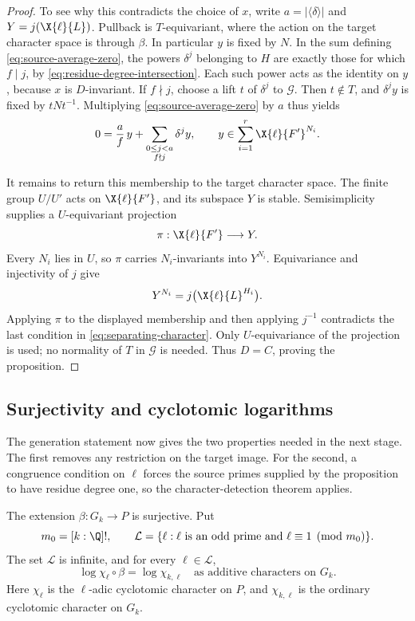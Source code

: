 \begin{proof}
To see why this contradicts the choice of $x$, write
$a=|\langle\delta\rangle|$ and $Y=j(\X{\ell}{L})$.
Pullback is $T$-equivariant, where the action on the target
character space is through $\beta$. In particular $y$ is fixed
by $N$. In the sum defining \eqref{eq:source-average-zero}, the
powers $\delta^j$ belonging to $H$ are exactly those for which
$f\mid j$, by \eqref{eq:residue-degree-intersection}. Each such
power acts as the identity on $y$, because $x$ is $D$-invariant.
If $f\nmid j$, choose a lift $t$ of $\delta^j$ to $\mathcal G$.
Then $t\notin T$, and $\delta^jy$ is fixed by $tNt^{-1}$.
Multiplying \eqref{eq:source-average-zero} by $a$ thus yields
\[
  0=\frac af\,y+\sum_{\substack{0\leq j<a\\f\nmid j}}\delta^jy,
  \qquad
  y\in\sum_{i=1}^r\X{\ell}{F'}^{N_i}.
\]

It remains to return this membership to the target character
space. The finite group $U/U'$ acts on $\X{\ell}{F'}$, and its
subspace $Y$ is stable. Semisimplicity supplies a $U$-equivariant
projection
\[
  \pi:\X{\ell}{F'}\longrightarrow Y.
\]
Every $N_i$ lies in $U$, so $\pi$ carries $N_i$-invariants into
$Y^{N_i}$. Equivariance and injectivity of $j$ give
\[
 Y^{N_i}=j\bigl(\X{\ell}{L}^{H_i}\bigr).
\]
Applying $\pi$ to the displayed membership and then applying
$j^{-1}$ contradicts the last condition in
\eqref{eq:separating-character}. Only $U$-equivariance of the
projection is used; no normality of $T$ in $\mathcal G$ is needed.
Thus $D=C$, proving the proposition.
\end{proof}

\subsection{Surjectivity and cyclotomic logarithms}

The generation statement now gives the two properties needed in the
next stage. The first removes any restriction on the target image.
For the second, a congruence condition on $\ell$ forces the source
primes supplied by the proposition to have residue degree one, so
the character-detection theorem applies.

\begin{theorem}\label{thm:normalized-map}
The extension $\beta:G_k\to P$ is surjective. Put
\[
 m_0=[k:\Q]!,\qquad
 \mathcal L=\{\ell:\ell\text{ is an odd prime and }
                    \ell\equiv1\pmod{m_0}\}.
\]
The set $\mathcal L$ is infinite, and for every $\ell\in\mathcal L$,
\begin{equation}\label{eq:cyclotomic-logarithms}
 \log\chi_\ell\circ\beta=\log\chi_{k,\ell}
 \quad\text{as additive characters on }G_k.
\end{equation}
Here $\chi_\ell$ is the $\ell$-adic cyclotomic character on $P$,
and $\chi_{k,\ell}$ is the ordinary cyclotomic character on $G_k$.
\end{theorem}

